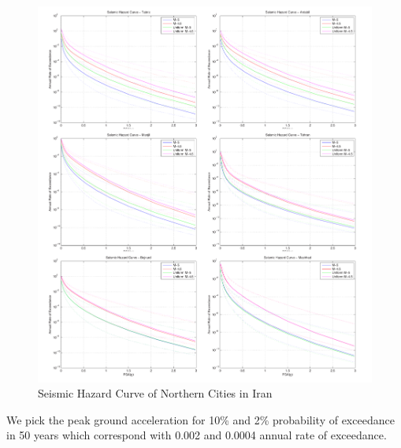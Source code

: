 \begin{figure} [!ht]
\centering
\includegraphics[scale=0.4]{figures/pdf/HazardCurve.pdf} 
\caption{Seismic Hazard Curve of Northern Cities in Iran}
\label{fig:hazardcurve}
\end{figure}


We pick the peak ground acceleration for 10\% and 2\% probability of exceedance in 50 years which correspond with 0.002 and 0.0004 annual rate of exceedance. 



